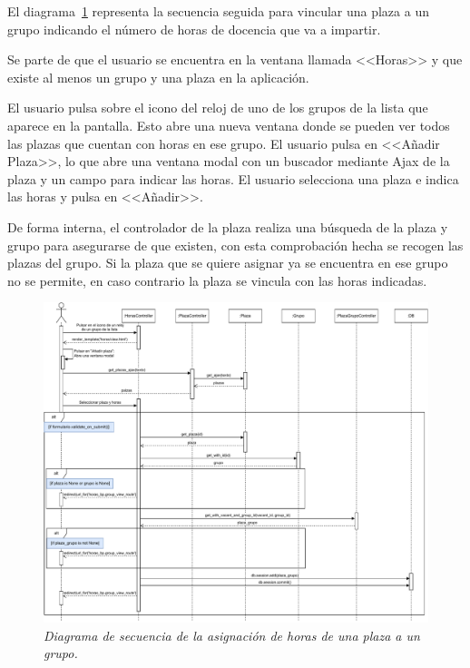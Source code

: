\begin{itemize}
El diagrama~\ref{DS-asignarHoras} representa la secuencia seguida para vincular una plaza a un grupo indicando el número de horas de docencia que va a impartir.

Se parte de que el usuario se encuentra en la ventana llamada <<Horas>> y que existe al menos un grupo y una plaza en la aplicación. 

El usuario pulsa sobre el icono del reloj de uno de los grupos de la lista que aparece en la pantalla. Esto abre una nueva ventana donde se pueden ver todos las plazas que cuentan con horas en ese grupo. El usuario pulsa en <<Añadir Plaza>>, lo que abre una ventana modal con un buscador mediante Ajax de la plaza y un campo para indicar las horas. El usuario selecciona una plaza e indica las horas y pulsa en <<Añadir>>.

De forma interna, el controlador de la plaza realiza una búsqueda de la plaza y grupo para asegurarse de que existen, con esta comprobación hecha se recogen las plazas del grupo. 
Si la plaza que se quiere asignar ya se encuentra en ese grupo no se permite, en caso contrario la plaza se vincula con las horas indicadas.

\begin{figure}
	\centering
	\includegraphics[width=\textwidth]{../img/Anexos/Diagramas secuencia/DS - asignar horas.pdf}
	\caption{\textit{Diagrama de secuencia de la asignación de horas de una plaza a un grupo.}}\label{DS-asignarHoras}
\end{figure}

\end{itemize}


